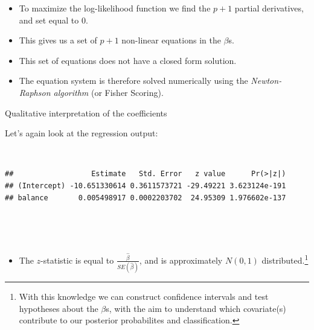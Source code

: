 \documentclass[
  10pt,
  ignorenonframetext,
]{beamer}
\newenvironment{Shaded}{\begin{snugshade}}{\end{snugshade}}
\newcommand{\FunctionTok}[1]{\textcolor[rgb]{0.13,0.29,0.53}{\textbf{#1}}}
\newcommand{\NormalTok}[1]{#1}
\newcommand{\SpecialCharTok}[1]{\textcolor[rgb]{0.81,0.36,0.00}{\textbf{#1}}}
\providecommand{\tightlist}{%
  \setlength{\itemsep}{0pt}\setlength{\parskip}{0pt}}
\begin{document}
\begin{frame}
\begin{itemize}
\item
  To maximize the log-likelihood function we find the \(p+1\) partial
  derivatives, and set equal to 0.
\item
  This gives us a set of \(p+1\) non-linear equations in the \(\beta\)s.
\item
  This set of equations does not have a closed form solution.
\item
  The equation system is therefore solved numerically using the
  \emph{Newton-Raphson algorithm} (or Fisher Scoring).
\end{itemize}
\end{frame}

\begin{frame}[fragile]
\begin{block}{Qualitative interpretation of the coefficients}
\protect\hypertarget{qualitative-interpretation-of-the-coefficients}{}
\(~\)

Let's again look at the regression output:

\(~\)

\scriptsize

\begin{Shaded}
\end{Shaded}

\begin{verbatim}
##                  Estimate   Std. Error   z value      Pr(>|z|)
## (Intercept) -10.651330614 0.3611573721 -29.49221 3.623124e-191
## balance       0.005498917 0.0002203702  24.95309 1.976602e-137
\end{verbatim}

\(~\)

\(~\)

\normalsize

\begin{itemize}
\tightlist
\item
  The \(z\)-statistic is equal to \(\frac{\hat\beta}{SE(\hat\beta)}\),
  and is approximately \(N(0,1)\)
  distributed.\footnote{With this knowledge we can construct confidence intervals and test hypotheses about the $\beta$s, with the aim to understand which covariate(s) contribute to our posterior probabilites and classification.}
\end{itemize}


\end{block}
\end{frame}
\end{document}
